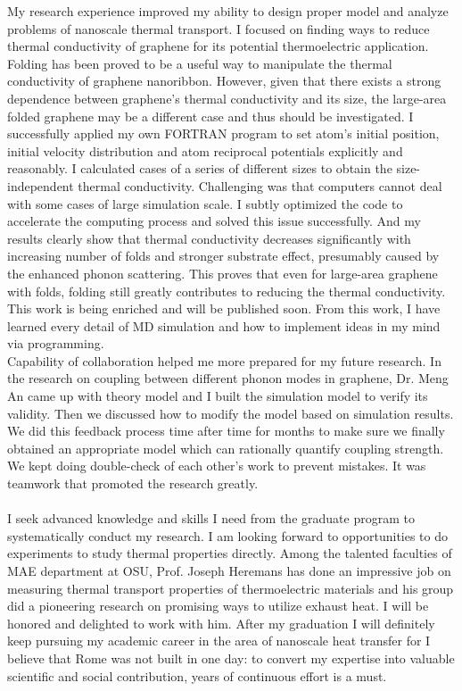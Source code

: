 \documentclass[a4paper,10pt]{article}
\begin{document}
\begin{spacing}{1.5}
My research experience improved my ability to design proper model and analyze problems of nanoscale thermal transport. I focused on finding ways to reduce thermal conductivity of graphene for its potential thermoelectric application. Folding has been proved to be a useful way to manipulate the thermal conductivity of graphene nanoribbon. However, given that there exists a strong dependence between graphene’s thermal conductivity and its size, the large-area folded graphene may be a different case and thus should be investigated. I successfully applied my own FORTRAN program to set atom’s initial position, initial velocity distribution and atom reciprocal potentials explicitly and reasonably. I calculated cases of a series of different sizes to obtain the size-independent thermal conductivity. Challenging was that computers cannot deal with some cases of large simulation scale. I subtly optimized the code to accelerate the computing process and solved this issue successfully. And my results clearly show that thermal conductivity decreases significantly with increasing number of folds and stronger substrate effect, presumably caused by the enhanced phonon scattering. This proves that even for large-area graphene with folds, folding still greatly contributes to reducing the thermal conductivity. This work is being enriched and will be published soon. From this work, I have learned every detail of MD simulation and how to implement ideas in my mind via programming.\\
Capability of collaboration helped me more prepared for my future research. In the research on coupling between different phonon modes in graphene, Dr. Meng An came up with theory model and I built the simulation model to verify its validity. Then we discussed how to modify the model based on simulation results. We did this feedback process time after time for months to make sure we finally obtained an appropriate model which can rationally quantify coupling strength. We kept doing double-check of each other’s work to prevent mistakes. It was teamwork that promoted the research greatly.\\
\\
I seek advanced knowledge and skills I need from the graduate program to systematically conduct my research. I am looking forward to opportunities to do experiments to study thermal properties directly. Among the talented faculties of MAE department at OSU, Prof. Joseph Heremans has done an impressive job on measuring thermal transport properties of thermoelectric materials and his group did a pioneering research on promising ways to utilize exhaust heat. I will be honored and delighted to work with him. After my graduation I will definitely keep pursuing my academic career in the area of nanoscale heat transfer for I believe that Rome was not built in one day: to convert my expertise into valuable scientific and social contribution, years of continuous effort is a must.\\

\end{spacing}
\end{document}
